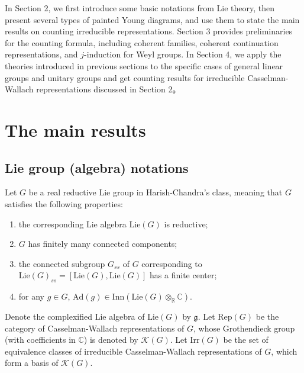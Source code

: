 \documentclass[12pt, a4paper]{amsart}
\numberwithin{equation}{section}
\newcommand{\BC}{{\mathbb {C}}}
\newcommand{\BR}{{\mathbb {R}}}
\newcommand{\CK}{{\mathcal {K}}}
\newcommand{\fg}{\mathfrak{g}}
\newcommand{\Irr}{{\mathrm{Irr}}}
\newcommand{\Inn}{{\mathrm{Inn}}}
\newcommand{\Ad}{{\mathrm{Ad}}}
\newcommand{\Lie}{{\mathrm{Lie}}}
\newcommand{\Rep}{{\mathrm{Rep}}}
\begin{document}
In Section 2, we first introduce some basic notations from Lie theory, then present several types of painted Young diagrams, and use them to state the main results on counting irreducible representations. Section 3 provides preliminaries for the counting formula, including coherent families, coherent continuation representations, and $j$-induction for Weyl groups. In Section 4, we apply the theories introduced in previous sections to the specific cases of general linear groups and unitary groups and get counting results for irreducible Casselman-Wallach representations discussed in Section 2。

   













\section{The main results}


\subsection{Lie group (algebra) notations}
Let $G$ be a real reductive Lie group in Harish-Chandra's class, meaning that $G$ satisfies the following properties:
\begin{enumerate}
   \item the corresponding Lie algebra $\Lie (G)$ is reductive;
   \item $G$ has finitely many connected components;
   \item the connected subgroup $G_{ss}$ of $G$ corresponding to $\Lie(G)_{ss} = [\Lie(G),\Lie(G)]$ has a finite center;
   \item for any $g \in G$, $\Ad(g) \in \Inn(\Lie(G) \otimes_{\BR} \BC)$.
\end{enumerate}

Denote the complexified Lie algebra of $\Lie(G)$ by $\fg$. Let $\Rep(G)$ be the category of Casselman-Wallach representations of $G$, whose Grothendieck group (with coefficients in $\BC$) is denoted by $\CK(G)$. Let $\Irr (G)$ be the set of equivalence classes of irreducible Casselman-Wallach representations of $G$, which form a basis of $\CK(G)$.
\end{document}

